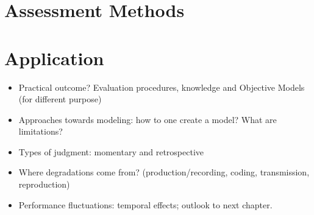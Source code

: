 


\section{Assessment Methods}



\section{Application}
\begin{itemize}
\item Practical outcome? Evaluation procedures, knowledge and Objective Models (for different purpose)
\item Approaches towards modeling: how to one create a model? What are limitations?
\item Types of judgment: momentary and retrospective
\item Where degradations come from? (production/recording, coding, transmission, reproduction)
\item Performance fluctuations: temporal effects; outlook to next chapter.
\end{itemize}

